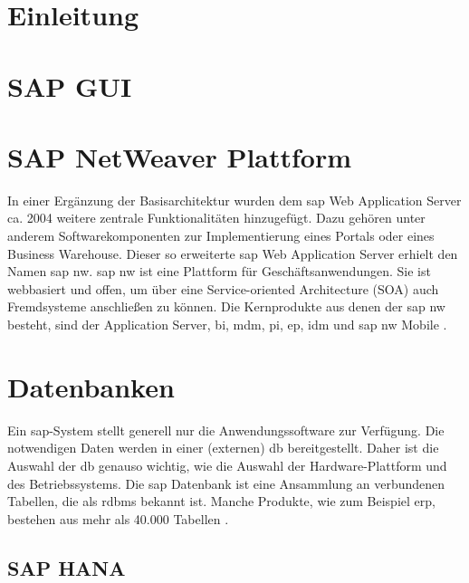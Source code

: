 \section{Einleitung}

\section{SAP GUI}
\label{sec:sapgui}

\section{SAP NetWeaver Plattform}
\label{sec:netweaver}
In einer Ergänzung der Basisarchitektur wurden dem \gls{sap} Web Application Server ca. 2004 weitere zentrale Funktionalitäten hinzugefügt. Dazu gehören unter anderem Softwarekomponenten zur Implementierung eines Portals oder eines Business Warehouse. Dieser so erweiterte \gls{sap} Web Application Server erhielt den Namen \gls{sap} \gls{nw}. \gls{sap} \gls{nw} ist eine Plattform für Geschäftsanwendungen. Sie ist webbasiert und offen, um über eine Service-oriented Architecture (SOA) auch Fremdsysteme anschließen zu können. Die Kernprodukte aus denen der \gls{sap} \gls{nw} besteht, sind der Application Server, \gls{bi}, \gls{mdm}, \gls{pi}, \gls{ep}, \gls{idm} und \gls{sap} \gls{nw} Mobile \cite{saptec}.

\section{Datenbanken}
Ein \gls{sap}-System stellt generell nur die Anwendungssoftware zur Verfügung. Die notwendigen Daten werden in einer (externen) \gls{db} bereitgestellt. Daher ist die Auswahl der \gls{db} genauso wichtig, wie die Auswahl der Hardware-Plattform und des Betriebssystems.
Die \gls{sap} Datenbank ist eine Ansammlung an verbundenen Tabellen, die als \gls{rdbms} bekannt ist. Manche Produkte, wie zum Beispiel \gls{erp}, bestehen aus mehr als 40.000 Tabellen \cite{SAPin24hrs}.

\subsection{SAP HANA}
\label{sec:db-hana}


